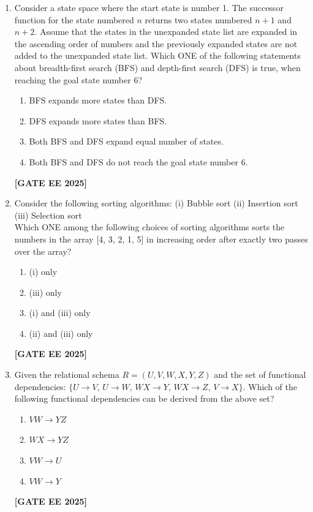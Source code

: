 \documentclass[journal]{IEEEtran}
\newcommand{\qfooter}{%
  \begin{flushright}\footnotesize\textbf{[GATE EE 2025]}\end{flushright}\vspace{1em}%
}
\begin{document}
\begin{enumerate}
\begin{enumerate}
\item $p = 36,\ q = 24,\ r = 24$
\item $p = 24,\ q = 24,\ r = 36$
\item $p = 18,\ q = 36,\ r = 24$
\item $p = 36,\ q = 36,\ r = 36$
\qfooter
\end{enumerate} \qfooter

\item Consider a state space where the start state is number 1. The successor function for the state numbered $n$ returns two states numbered $n+1$ and $n+2$. Assume that the states in the unexpanded state list are expanded in the ascending order of numbers and the previously expanded states are not added to the unexpanded state list. Which ONE of the following statements about breadth-first search (BFS) and depth-first search (DFS) is true, when reaching the goal state number 6?
\begin{multicols}{2}
\begin{enumerate}
\item BFS expands more states than DFS.
\item DFS expands more states than BFS.
\item Both BFS and DFS expand equal number of states.
\item Both BFS and DFS do not reach the goal state number 6.
\end{enumerate} \qfooter
\end{multicols}

\item Consider the following sorting algorithms:
(i) Bubble sort
(ii) Insertion sort
(iii) Selection sort\\
Which ONE among the following choices of sorting algorithms sorts the numbers in the array [4, 3, 2, 1, 5] in increasing order after exactly two passes over the array?
\begin{multicols}{2}
\begin{enumerate}
\item (i) only
\item (iii) only
\item (i) and (iii) only
\item (ii) and (iii) only
\end{enumerate} \qfooter
\end{multicols}

\item Given the relational schema $R = (U,V,W,X,Y,Z)$ and the set of functional dependencies: $\{U \to V,\, U \to W,\, WX \to Y,\, WX \to Z,\, V \to X\}$. Which of the following functional dependencies can be derived from the above set?
\begin{multicols}{2}
\begin{enumerate}
\item $VW \to YZ$
\item $WX \to YZ$
\item $VW \to U$
\item $VW \to Y$
\end{enumerate} \qfooter
\end{multicols}


\end{enumerate}
\end{document}
